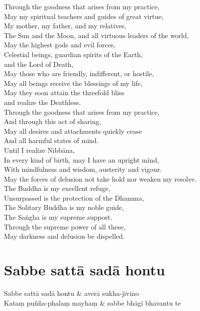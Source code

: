 
Through the goodness that arises from my practice,\\
May my spiritual teachers and guides of great virtue,\\
My mother, my father, and my relatives,\\
The Sun and the Moon, and all virtuous leaders of the world,\\
May the highest gods and evil forces,\\
Celestial beings, guardian spirits of the Earth,\\\vin and the Lord of Death,\\
May those who are friendly, indifferent, or hostile,\\
May all beings receive the blessings of my life,\\
May they soon attain the threefold bliss\\\vin and realize the Deathless.\\
Through the goodness that arises from my practice,\\
And through this act of sharing,\\
May all desires and attachments quickly cease\\
And all harmful states of mind.\\
Until I realize Nibbāna,\\
In every kind of birth, may I have an upright mind,\\
With mindfulness and wisdom, austerity and vigour.\\
May the forces of delusion not take hold nor weaken my resolve.\\
The Buddha is my excellent refuge,\\
Unsurpassed is the protection of the Dhamma,\\
The Solitary Buddha is my noble guide,\\
The Saṅgha is my supreme support.\\
Through the supreme power of all these,\\
May darkness and delusion be dispelled.

\section{Sabbe sattā sadā hontu}


\begin{twochants}
Sabbe sattā sadā hontu & averā sukha-jīvino\\
Kataṃ puñña-phalaṃ mayhaṃ & sabbe bhāgī bhavantu te
\end{twochants}

